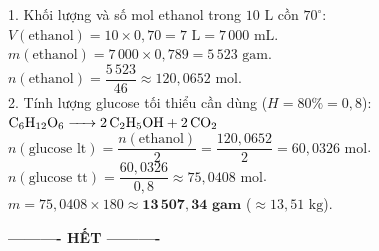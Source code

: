 \documentclass[11pt,a4paper]{article}
\begin{document}
\begin{tcolorbox}[colback=tableGreen!30,colframe=mainGreen!70,title=\textbf{Hướng dẫn giải chi tiết Câu 3},fonttitle=\bfseries]
1. Khối lượng và số mol ethanol trong $10\text{ L}$ cồn $70^\circ$:\\
$V(\text{ethanol}) = 10 \times 0,70 = 7\text{ L} = 7\,000\text{ mL}$.\\
$m(\text{ethanol}) = 7\,000 \times 0,789 = 5\,523\text{ gam}$.\\
$n(\text{ethanol}) = \dfrac{5\,523}{46} \approx 120,0652\text{ mol}$.\\[4pt]
2. Tính lượng glucose tối thiểu cần dùng ($H = 80\% = 0,8$):\\
$\ce{C6H12O6 -> 2 C2H5OH + 2 CO2}$\\
$n(\text{glucose lt}) = \dfrac{n(\text{ethanol})}{2} = \dfrac{120,0652}{2} = 60,0326\text{ mol}$.\\
$n(\text{glucose tt}) = \dfrac{60,0326}{0,8} \approx 75,0408\text{ mol}$.\\
$m = 75,0408 \times 180 \approx \mathbf{13\,507,34\text{ gam}}$ ($\approx 13,51\text{ kg}$).
\end{tcolorbox}

\vspace{8pt}
\begin{center}
\textbf{---------- HẾT ----------}
\end{center}
\end{document}
